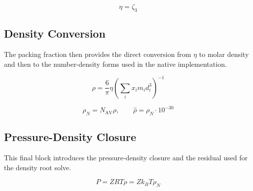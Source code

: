 \documentclass[12pt, letterpaper]{article}
\begin{document}
\begin{equation}
    \eta=\zeta_{3}
    \label{eq:zeta3_eta}
\end{equation}

\subsection{Density Conversion}

The packing fraction then provides the direct conversion from \(\eta\) to molar density and then to the number-density forms used in the native implementation.

\begin{equation}
    \rho=\frac{6}{\pi} \eta\left(\sum_{i} x_{i} m_{i} d_{i}^3\right)^{-1}
    \label{eq:rho_from_eta}
\end{equation}


\begin{equation}
    \rho_{N}=N_{\mathrm{AV}}\rho,
    \qquad
    \hat{\rho}=\rho_{N}\cdot 10^{-30}
    \label{eq:rho_reduced}
\end{equation}

\subsection{Pressure-Density Closure}

This final block introduces the pressure-density closure and the residual used for the density root solve.

\begin{equation}
    P = ZRT\rho = Zk_{B}T\rho_{N}
    \label{eq:pressure_from_z}
\end{equation}
\end{document}
